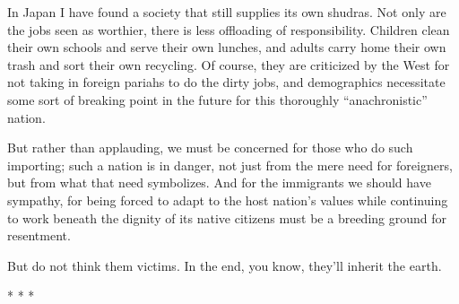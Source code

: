 In Japan I have found a society that still supplies its own shudras. Not only are the jobs seen as worthier, there is less offloading of responsibility. Children clean their own schools and serve their own lunches, and adults carry home their own trash and sort their own recycling. Of course, they are criticized by the West for not taking in foreign pariahs to do the dirty jobs, and demographics necessitate some sort of breaking point in the future for this thoroughly ``anachronistic'' nation.

But rather than applauding, we must be concerned for those who do such importing; such a nation is in danger, not just from the mere need for foreigners, but from what that need symbolizes. And for the immigrants we should have sympathy, for being forced to adapt to the host nation's values while continuing to work beneath the dignity of its native citizens must be a breeding ground for resentment.

But do not think them victims. In the end, you know, they'll inherit the earth.



\begin{center}* * *\end{center}


